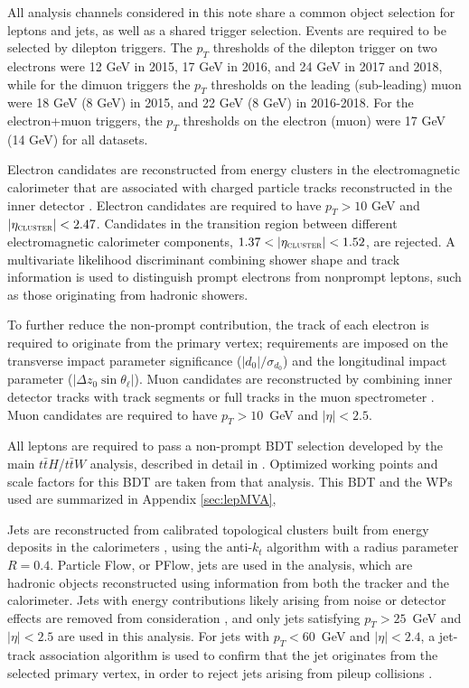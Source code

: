
All analysis channels considered in this note share a common object selection for leptons and jets, as well as a shared trigger selection. Events are required to be selected by dilepton triggers. The $p_T$ thresholds of the dilepton trigger on two electrons were 12 GeV in 2015, 17 GeV in 2016, and 24 GeV in 2017 and 2018, while for the dimuon triggers the $p_T$ thresholds on the leading (sub-leading) muon were 18 GeV (8 GeV) in 2015, and 22 GeV (8 GeV) in 2016-2018. For the electron+muon triggers, the $p_T$ thresholds on the electron (muon) were 17 GeV (14 GeV) for all datasets.

Electron candidates are reconstructed from energy clusters in the electromagnetic calorimeter that are associated with charged particle tracks reconstructed in the inner detector \cite{ATLAS-CONF-2016-024}.  Electron candidates are required to have $p_T > 10$ GeV and $|\eta_\textsc{cluster}| < 2.47$. Candidates in the transition region between different electromagnetic calorimeter components, $1.37 < |\eta_\textsc{cluster}| < 1.52$, are rejected. A multivariate likelihood discriminant combining shower shape and track information is used to distinguish prompt electrons from nonprompt leptons, such as those originating from hadronic showers. %

To further reduce the non-prompt contribution, the track of each electron is required to originate from the primary vertex; requirements are imposed on the transverse impact parameter significance ($|d_0|/\sigma_{d_0}$) and the longitudinal impact parameter ($|\Delta z_0 \sin \theta_\ell|$). Muon candidates are reconstructed by combining inner detector tracks with track segments or full tracks in the muon spectrometer \cite{PERF-2014-05}. Muon candidates are required to have $p_T > 10$~GeV and $|\eta| < 2.5$. %

All leptons are required to pass a non-prompt BDT selection developed by the main $t\bar{t}H$/$t\bar{t}W$ analysis, described in detail in \cite{ttH_paper}. Optimized working points and scale factors for this BDT are taken from that analysis. This BDT and the WPs used are summarized in Appendix \ref{sec:lepMVA},

Jets are reconstructed from calibrated topological clusters built from energy deposits in the calorimeters \cite{ATL-PHYS-PUB-2015-015}, using the anti-$k_t$ algorithm with a radius parameter $R=0.4$. Particle Flow, or PFlow, jets are used in the analysis, which are hadronic objects reconstructed using information from both the tracker and the calorimeter. Jets with energy contributions likely arising from noise or detector effects are removed from consideration \cite{ATLAS-CONF-2015-029}, and only jets satisfying $p_T > 25$~GeV and $|\eta| < 2.5$ are used in this analysis.  For jets with $p_T < 60$~GeV and $|\eta| < 2.4$, a jet-track association algorithm is used to confirm that the jet originates from the selected primary vertex, in order to reject jets arising from pileup collisions \cite{PERF-2014-03}. 

